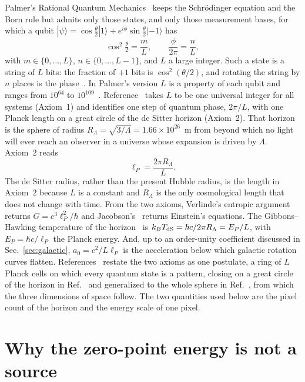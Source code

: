 \documentclass[aps,prd,twocolumn,superscriptaddress,nofootinbib,showkeys]{revtex4-2}
\begin{document}
Palmer's Rational Quantum Mechanics~\cite{palmer2020,palmer2026} keeps the Schr\"odinger equation and the Born rule but admits only those states, and only those measurement bases, for which a qubit $|\psi\rangle=\cos\frac{\theta}{2}|1\rangle+e^{i\phi}\sin\frac{\theta}{2}|{-1}\rangle$ has
\begin{equation}
\cos^2\tfrac{\theta}{2} = \frac{m}{L},\qquad \frac{\phi}{2\pi}=\frac{n}{L},
\label{eq:raqm}
\end{equation}
with $m\in\{0,\dots,L\}$, $n\in\{0,\dots,L-1\}$, and $L$ a large integer. Such a state is a string of $L$ bits: the fraction of $+1$ bits is $\cos^2(\theta/2)$, and rotating the string by $n$ places is the phase~\cite{palmer2026}. In Palmer's version $L$ is a property of each qubit and ranges from $10^{64}$ to $10^{109}$~\cite{palmer2026}. Reference~\cite{korytko2026} takes $L$ to be one universal integer for all systems (Axiom~1) and identifies one step of quantum phase, $2\pi/L$, with one Planck length on a great circle of the de Sitter horizon (Axiom~2). That horizon is the sphere of radius $R_\Lambda=\sqrt{3/\Lambda} = 1.66\times10^{26}$~m from beyond which no light will ever reach an observer in a universe whose expansion is driven by $\Lambda$. Axiom~2 reads
\begin{equation}
\ell_P = \frac{2\pi R_\Lambda}{L}.
\label{eq:axiom2}
\end{equation}
The de Sitter radius, rather than the present Hubble radius, is the length in Axiom~2 because $L$ is a constant and $R_\Lambda$ is the only cosmological length that does not change with time. From the two axioms, Verlinde's entropic argument~\cite{verlinde2011} returns $G=c^3\ell_P^2/\hbar$ and Jacobson's~\cite{jacobson1995} returns Einstein's equations. The Gibbons--Hawking temperature of the horizon~\cite{gibbons1977} is $k_BT_{\rm dS}=\hbar c/2\pi R_\Lambda = E_P/L$, with $E_P = \hbar c/\ell_P$ the Planck energy. And, up to an order-unity coefficient discussed in Sec.~\ref{sec:galactic}, $a_0=c^2/L\ell_P$ is the acceleration below which galactic rotation curves flatten. References~\cite{korytko2026c,korytko2026d} restate the two axioms as one postulate, a ring of $L$ Planck cells on which every quantum state is a pattern, closing on a great circle of the horizon in Ref.~\cite{korytko2026c} and generalized to the whole sphere in Ref.~\cite{korytko2026d}, from which the three dimensions of space follow. The two quantities used below are the pixel count of the horizon and the energy scale of one pixel.

\section{Why the zero-point energy is not a source}
\label{sec:decoupling}
\end{document}
